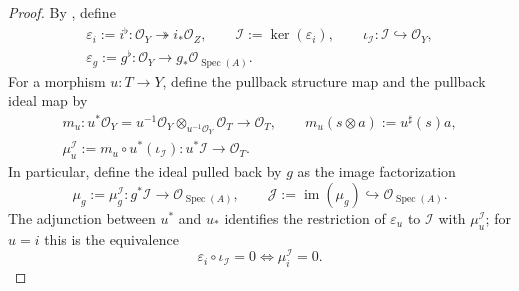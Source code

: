 \begin{proof}
  By , define
  \[
  \begin{gathered}
    \varepsilon_i:=i^\flat\colon
      \mathcal O_Y\twoheadrightarrow i_*\mathcal O_Z,
    \qquad
    \mathcal I:=\ker(\varepsilon_i),
    \qquad
    \iota_{\mathcal I}\colon\mathcal I\hookrightarrow\mathcal O_Y,\\
    \varepsilon_g:=g^\flat\colon
      \mathcal O_Y\longrightarrow g_*\mathcal O_{\operatorname{Spec}(A)}.
  \end{gathered}                                                   \tag{VF0}
  \]
  For a morphism $u\colon T\to Y$, define the pullback structure map and
  the pullback ideal map by
  \[
  \begin{gathered}
    m_u\colon
      u^*\mathcal O_Y
      =u^{-1}\mathcal O_Y\otimes_{u^{-1}\mathcal O_Y}\mathcal O_T
        \longrightarrow\mathcal O_T,
    \qquad
    m_u(s\otimes a):=u^\sharp(s)a,\\
    \mu_u^{\mathcal I}:=
      m_u\circ u^*(\iota_{\mathcal I})
      \colon u^*\mathcal I\longrightarrow\mathcal O_T.
  \end{gathered}                                                   \tag{VF1}
  \]
  In particular, define the ideal pulled back by $g$ as the image
  factorization
  \[
    \mu_g:=\mu_g^{\mathcal I}\colon
      g^*\mathcal I\longrightarrow
        \mathcal O_{\operatorname{Spec}(A)},
    \qquad
    \mathcal J:=\operatorname{im}(\mu_g)
      \hookrightarrow\mathcal O_{\operatorname{Spec}(A)}.        \tag{VF2}
  \]
  The adjunction between $u^*$ and $u_*$ identifies the restriction of
  $\varepsilon_u$ to $\mathcal I$ with $\mu_u^{\mathcal I}$; for
  $u=i$ this is the equivalence
  \[
    \varepsilon_i\circ\iota_{\mathcal I}=0
      \Longleftrightarrow \mu_i^{\mathcal I}=0.                  \tag{VF3}
  \]


\end{proof}
